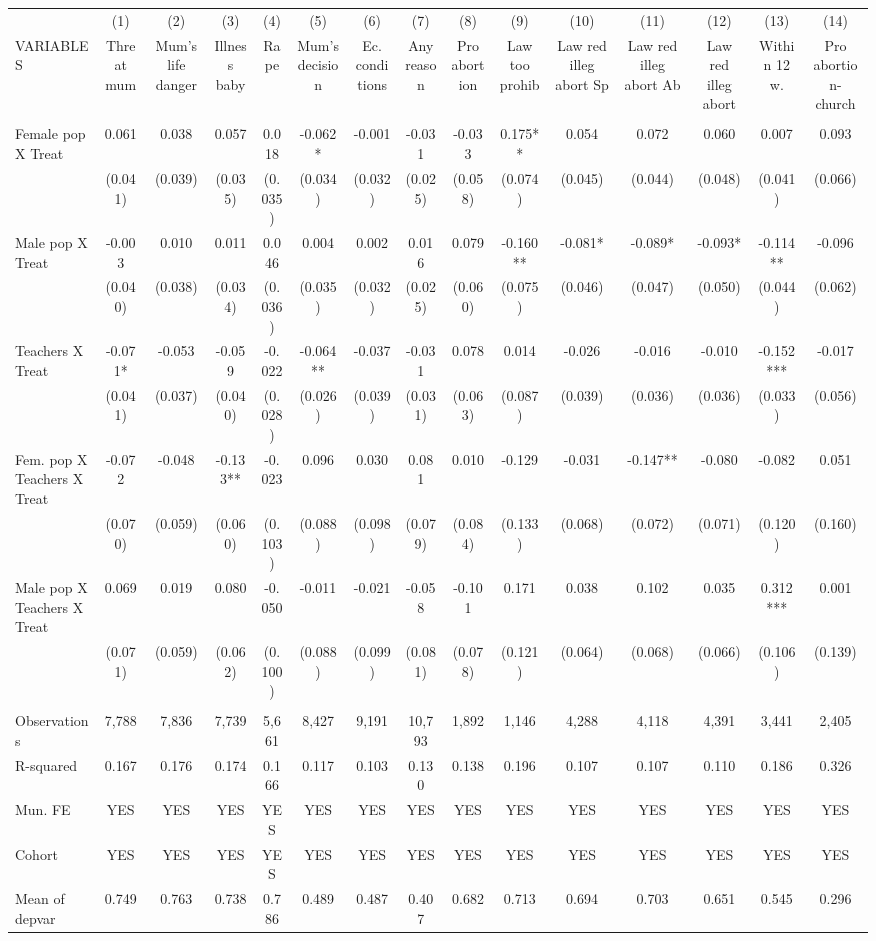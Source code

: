 \begin{tabular}{lcccccccccccccc} \hline
 & (1) & (2) & (3) & (4) & (5) & (6) & (7) & (8) & (9) & (10) & (11) & (12) & (13) & (14) \\
VARIABLES & Threat mum & Mum's life danger & Illness baby & Rape & Mum's decision & Ec. conditions & Any reason & Pro abortion & Law too prohib & Law red illeg abort Sp & Law red illeg abort Ab & Law red illeg abort & Within 12 w. & Pro abortion-church \\ \hline
 &  &  &  &  &  &  &  &  &  &  &  &  &  &  \\
Female pop X Treat & 0.061 & 0.038 & 0.057 & 0.018 & -0.062* & -0.001 & -0.031 & -0.033 & 0.175** & 0.054 & 0.072 & 0.060 & 0.007 & 0.093 \\
 & (0.041) & (0.039) & (0.035) & (0.035) & (0.034) & (0.032) & (0.025) & (0.058) & (0.074) & (0.045) & (0.044) & (0.048) & (0.041) & (0.066) \\
Male pop X Treat & -0.003 & 0.010 & 0.011 & 0.046 & 0.004 & 0.002 & 0.016 & 0.079 & -0.160** & -0.081* & -0.089* & -0.093* & -0.114** & -0.096 \\
 & (0.040) & (0.038) & (0.034) & (0.036) & (0.035) & (0.032) & (0.025) & (0.060) & (0.075) & (0.046) & (0.047) & (0.050) & (0.044) & (0.062) \\
Teachers X Treat & -0.071* & -0.053 & -0.059 & -0.022 & -0.064** & -0.037 & -0.031 & 0.078 & 0.014 & -0.026 & -0.016 & -0.010 & -0.152*** & -0.017 \\
 & (0.041) & (0.037) & (0.040) & (0.028) & (0.026) & (0.039) & (0.031) & (0.063) & (0.087) & (0.039) & (0.036) & (0.036) & (0.033) & (0.056) \\
Fem. pop X Teachers X Treat & -0.072 & -0.048 & -0.133** & -0.023 & 0.096 & 0.030 & 0.081 & 0.010 & -0.129 & -0.031 & -0.147** & -0.080 & -0.082 & 0.051 \\
 & (0.070) & (0.059) & (0.060) & (0.103) & (0.088) & (0.098) & (0.079) & (0.084) & (0.133) & (0.068) & (0.072) & (0.071) & (0.120) & (0.160) \\
Male pop X Teachers X Treat & 0.069 & 0.019 & 0.080 & -0.050 & -0.011 & -0.021 & -0.058 & -0.101 & 0.171 & 0.038 & 0.102 & 0.035 & 0.312*** & 0.001 \\
 & (0.071) & (0.059) & (0.062) & (0.100) & (0.088) & (0.099) & (0.081) & (0.078) & (0.121) & (0.064) & (0.068) & (0.066) & (0.106) & (0.139) \\
 &  &  &  &  &  &  &  &  &  &  &  &  &  &  \\
Observations & 7,788 & 7,836 & 7,739 & 5,661 & 8,427 & 9,191 & 10,793 & 1,892 & 1,146 & 4,288 & 4,118 & 4,391 & 3,441 & 2,405 \\
R-squared & 0.167 & 0.176 & 0.174 & 0.166 & 0.117 & 0.103 & 0.130 & 0.138 & 0.196 & 0.107 & 0.107 & 0.110 & 0.186 & 0.326 \\
Mun. FE & YES & YES & YES & YES & YES & YES & YES & YES & YES & YES & YES & YES & YES & YES \\
Cohort & YES & YES & YES & YES & YES & YES & YES & YES & YES & YES & YES & YES & YES & YES \\
 Mean of depvar & 0.749 & 0.763 & 0.738 & 0.786 & 0.489 & 0.487 & 0.407 & 0.682 & 0.713 & 0.694 & 0.703 & 0.651 & 0.545 & 0.296 \\ \hline
\end{tabular}
